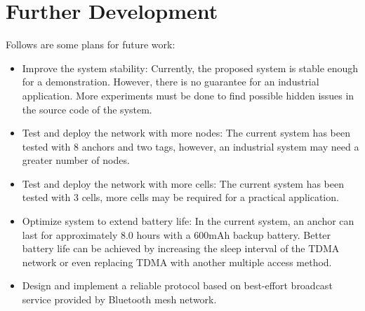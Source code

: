 \documentclass[\main/main.tex]{subfiles}
\begin{document}
\section{Further Development}
Follows are some plans for future work:
\begin{itemize}
    \item Improve the system stability: Currently, the proposed system is stable enough for a demonstration. However, there is no guarantee for an industrial application. More experiments must be done to find possible hidden issues in the source code of the system.
    \item Test and deploy the network with more nodes: The current system has been tested with 8 anchors and two tags, however, an industrial system may need a greater number of nodes.
    \item Test and deploy the network with more cells: The current system has been tested with 3 cells, more cells may be required for a practical application.
    \item Optimize system to extend battery life: In the current system, an anchor can last for approximately 8.0 hours with a 600mAh backup battery. Better battery life can be achieved by increasing the sleep interval of the TDMA network or even replacing TDMA with another multiple access method.
    \item Design and implement a reliable protocol based on best-effort broadcast service provided by Bluetooth mesh network.
\end{itemize}
\end{document}
